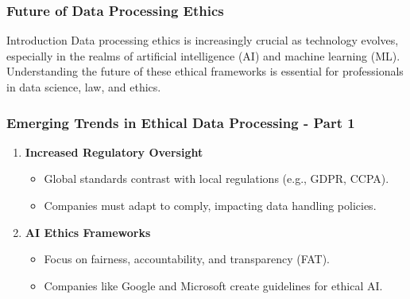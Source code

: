 \documentclass[aspectratio=169]{beamer}
\begin{document}
\begin{frame}[fragile]
  \frametitle{Future of Data Processing Ethics}
  \begin{block}{Introduction}
    Data processing ethics is increasingly crucial as technology evolves, especially in the realms of artificial intelligence (AI) and machine learning (ML). 
    Understanding the future of these ethical frameworks is essential for professionals in data science, law, and ethics.
  \end{block}
\end{frame}

\begin{frame}[fragile]
  \frametitle{Emerging Trends in Ethical Data Processing - Part 1}
  \begin{enumerate}
    \item \textbf{Increased Regulatory Oversight}
      \begin{itemize}
        \item Global standards contrast with local regulations (e.g., GDPR, CCPA).
        \item Companies must adapt to comply, impacting data handling policies.
      \end{itemize}
      
    \item \textbf{AI Ethics Frameworks}
      \begin{itemize}
        \item Focus on fairness, accountability, and transparency (FAT).
        \item Companies like Google and Microsoft create guidelines for ethical AI.
      \end{itemize}
  \end{enumerate}
\end{frame}
\end{document}
